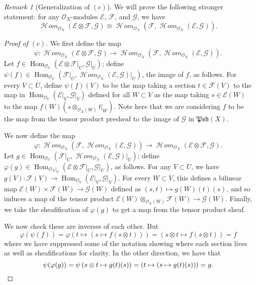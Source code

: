 \documentclass[12pt,letterpaper]{article}
\theoremstyle{definition}
\theoremstyle{remark}
\newtheorem*{remark}{Remark}
\numberwithin{equation}{section}
\numberwithin{figure}{problem}
\DeclareMathOperator{\Hom}{Hom}
\newcommand{\EE}{\mathscr{E}}
\newcommand{\FF}{\mathscr{F}}
\newcommand{\GG}{\mathscr{G}}
\newcommand{\OO}{\mathcal{O}}
\newcommand{\Psh}{\mathfrak{Psh}}
\DeclareMathOperator{\HHom}{\mathscr{H}\!\mathit{om}}
\begin{document}
\begin{remark}[Generalization of $(c)$]
  We will prove the following stronger statement: for any $\OO_X$-modules $\EE$, $\FF$, and $\GG$, we have
  \begin{equation*}
    \HHom_{\OO_X}(\EE\otimes\FF,\GG) \cong \HHom_{\OO_X}(\FF,\HHom_{\OO_X}(\EE,\GG)).
  \end{equation*}
\end{remark}
\begin{proof}[Proof of $(c)$]
  We first define the map
  \begin{equation*}
    \psi\colon \HHom_{\OO_X}(\EE\otimes\FF,\GG) \to \HHom_{\OO_X}(\FF,\HHom_{\OO_X}(\EE,\GG)).
  \end{equation*}
  Let $f \in \Hom_{\OO_U}(\EE\otimes\FF\vert_U,\GG\vert_U)$; define $\psi(f) \in \Hom_{\OO_U}(\FF\vert_U,\HHom_{\OO_X}(\EE,\GG)\vert_U)$, the image of $f$, as follows. For every $V \subset U$, define $\psi(f)(V)$ to be the map taking a section $t \in \FF(V)$ to the map in $\Hom_{\OO_V}(\EE\vert_V,\GG\vert_V)$ defined for all $W \subset V$ as the map taking $s \in \EE(W)$ to the map $f(W)(s \otimes_{\OO_X(W)} t\vert_W)$. Note here that we are considering $f$ to be the map from the tensor product presheaf to the image of $\GG$ in $\Psh(X)$.
  \par We now define the map
  \begin{equation*}
    \varphi\colon \HHom_{\OO_X}(\FF,\HHom_{\OO_X}(\EE,\GG)) \to \HHom_{\OO_X}(\EE\otimes\FF,\GG).
  \end{equation*}
  Let $g \in \Hom_{\OO_U}(\FF\vert_U,\HHom_{\OO_X}(\EE,\GG)\vert_U)$; define $\varphi(g) \in \Hom_{\OO_X\vert_U}(\EE\otimes\FF\vert_U,\GG\vert_U)$, as follows. For any $V \subset U$, we have $g(V)\colon\FF(V) \to \Hom_{\OO_V}(\EE\vert_V,\GG\vert_V)$. For every $W \subset V$, this defines a bilinear map $\EE(W) \times \FF(W) \to \GG(W)$ defined as $(s,t) \mapsto g(W)(t)(s)$, and so induces a map of the tensor product $\EE(W) \otimes_{\OO_X(W)} \FF(W) \to \GG(W)$. Finally, we take the sheafification of $\varphi(g)$ to get a map from the tensor product sheaf.
  \par We now check these are inverses of each other. But
  \begin{equation*}
    \varphi(\psi(f)) = \varphi\left( t \mapsto \left( s \mapsto f(s \otimes t) \right)\right) = \left( s \otimes t \mapsto f(s \otimes t) \right) = f
  \end{equation*}
  where we have suppressed some of the notation showing where each section lives as well as sheafifications for clarity. In the other direction, we have that
  \begin{equation*}
    \psi(\varphi(g)) = \psi\left( s \otimes t \mapsto g(t)(s) \right) = \left( t \mapsto \left( s \mapsto g(t)(s) \right) \right) = g.\qedhere
  \end{equation*}
\end{proof}
\end{document}
